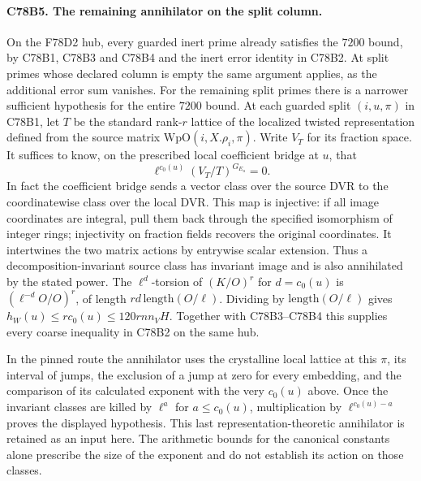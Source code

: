 \paragraph{C78B5. The remaining annihilator on the split column.}
On the F78D2 hub, every guarded inert prime already satisfies the
$7200$ bound, by C78B1, C78B3 and C78B4 and the inert error identity
in C78B2. At split primes whose declared column is empty the same
argument applies, as the additional error sum vanishes.
For the remaining split primes there is a narrower sufficient
hypothesis for the entire $7200$ bound. At each guarded split $(i,u,\pi)$ in C78B1,
let $T$ be the standard rank-$r$ lattice of the localized twisted
representation defined from the source matrix $\mathrm{WpO}(i,X.\rho_i,\pi)$.
Write $V_T$ for its fraction space. It suffices to know, on the
prescribed local coefficient bridge at $u$, that
\[
     \ell^{c_0(u)} (V_T/T)^{G_{E_u}}=0 .
\]
In fact the coefficient bridge sends a vector class over the source DVR
to the coordinatewise class over the local DVR. This map is injective:
if all image coordinates are integral, pull them back through the
specified isomorphism of integer rings; injectivity on fraction fields
recovers the original coordinates. It intertwines the two matrix
actions by entrywise scalar extension. Thus a decomposition-invariant
source class has invariant image and is also annihilated by the stated
power. The $\ell^{d}$-torsion of $(K/O)^r$ for $d=c_0(u)$ is
$(\ell^{-d}O/O)^r$, of length $rd\,\mathrm{length}(O/\ell)$.
Dividing by $\mathrm{length}(O/\ell)$ gives
$h_W(u)\le r c_0(u)\le120rn n_VH$. Together with C78B3--C78B4
this supplies every coarse inequality in C78B2 on the same hub.

In the pinned route the annihilator uses the crystalline local lattice
at this $\pi$, its interval of jumps, the exclusion of a jump at zero
for every embedding, and the comparison of its calculated exponent
with the very $c_0(u)$ above. Once the invariant classes are killed
by $\ell^a$ for $a\le c_0(u)$, multiplication by
$\ell^{c_0(u)-a}$ proves the displayed hypothesis. This last
representation-theoretic annihilator is retained as an input here.
The arithmetic bounds for the canonical constants alone prescribe the
size of the exponent and do not establish its action on those classes.
